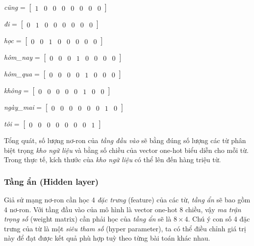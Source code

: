 \textit{cũng} = $\begin{bmatrix}
        1 & 0 & 0 & 0 & 0 & 0 & 0 & 0
    \end{bmatrix}$
    
\textit{đi} = $\begin{bmatrix}
        0 & 1 &0 & 0 & 0 & 0 & 0 & 0
    \end{bmatrix}$
    
\textit{học} = $\begin{bmatrix}
        0 & 0 & 1 & 0 & 0 & 0 & 0 & 0
    \end{bmatrix}$
    
\textit{hôm\_nay} = $\begin{bmatrix}
        0 & 0 & 0 & 1 & 0 & 0 & 0 & 0
    \end{bmatrix}$
    
\textit{hôm\_qua} = $\begin{bmatrix}
        0 & 0 & 0 & 0 & 1 & 0 & 0 & 0
    \end{bmatrix}$
    
\textit{không} = $\begin{bmatrix}
        0 & 0 & 0 & 0 & 0 & 1 & 0 & 0
    \end{bmatrix}$
    
\textit{ngày\_mai} = $\begin{bmatrix}
        0 & 0 & 0 & 0 & 0 & 0 & 1 & 0
    \end{bmatrix}$
    
\textit{tôi} = $\begin{bmatrix}
        0 & 0 & 0 & 0 & 0 & 0 & 0 & 1
    \end{bmatrix}$

Tổng quát, số lượng nơ-ron của \textit{tầng đầu vào} sẽ bằng đúng số lượng các từ phân biệt trọng \textit{kho ngữ liệu} và bằng số chiều của vector one-hot biểu diễn cho mỗi từ. Trong thực tế, kích thước của \textit{kho ngữ liệu} có thể lên đến hàng triệu từ.

\subsubsection{Tầng ẩn (Hidden layer)}
Giả sử mạng nơ-ron cần học 4 \textit{đặc trưng} (feature) của các từ, \textit{tầng ẩn} sẽ bao gồm 4 nơ-ron. Với tầng đầu vào của mô hình là vector one-hot 8 chiều, vậy \textit{ma trận trọng số} (weight matrix) cần phải học của \textit{tầng ẩn} sẽ là $8\times 4$. Chú ý con số 4 đặc trưng của từ là một \textit{siêu tham số} (hyper parameter), ta có thể điều chỉnh giá trị này để đạt được kết quả phù hợp tuỳ theo từng bài toán khác nhau.\\

